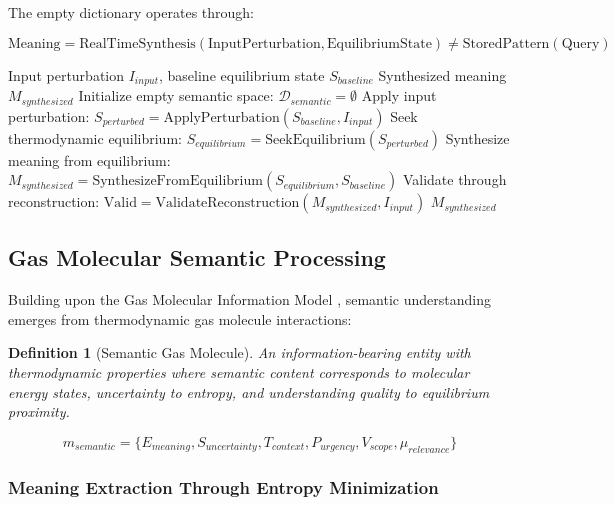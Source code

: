 \documentclass[11pt,a4paper]{article}
\newtheorem{definition}[theorem]{Definition}
\begin{document}
The empty dictionary operates through:

\begin{equation}
\text{Meaning} = \text{RealTimeSynthesis}(\text{InputPerturbation}, \text{EquilibriumState}) \neq \text{StoredPattern}(\text{Query})
\end{equation}

\begin{algorithm}
\caption{Empty Dictionary Semantic Synthesis}
\begin{algorithmic}[1]
\REQUIRE Input perturbation $I_{input}$, baseline equilibrium state $S_{baseline}$
\ENSURE Synthesized meaning $M_{synthesized}$ 
\STATE Initialize empty semantic space: $\mathcal{D}_{semantic} = \emptyset$
\STATE Apply input perturbation: $S_{perturbed} = \text{ApplyPerturbation}(S_{baseline}, I_{input})$
\STATE Seek thermodynamic equilibrium: $S_{equilibrium} = \text{SeekEquilibrium}(S_{perturbed})$
\STATE Synthesize meaning from equilibrium: $M_{synthesized} = \text{SynthesizeFromEquilibrium}(S_{equilibrium}, S_{baseline})$
\STATE Validate through reconstruction: $\text{Valid} = \text{ValidateReconstruction}(M_{synthesized}, I_{input})$
\RETURN $M_{synthesized}$
\end{algorithmic}
\end{algorithm}

\subsection{Gas Molecular Semantic Processing}

Building upon the Gas Molecular Information Model \citep{sachikonye2025gas}, semantic understanding emerges from thermodynamic gas molecule interactions:

\begin{definition}[Semantic Gas Molecule]
An information-bearing entity with thermodynamic properties where semantic content corresponds to molecular energy states, uncertainty to entropy, and understanding quality to equilibrium proximity.
\end{definition}

\begin{equation}
m_{semantic} = \{E_{meaning}, S_{uncertainty}, T_{context}, P_{urgency}, V_{scope}, \mu_{relevance}\}
\end{equation}

\subsubsection{Meaning Extraction Through Entropy Minimization}
\end{document}
